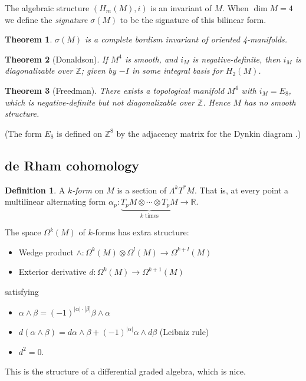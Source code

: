 \documentclass[a4paper]{article}
\newtheorem*{theorem}{Theorem}
\theoremstyle{definition}
\newtheorem*{definition}{Definition}
\theoremstyle{remark}
\newcommand{\Z}{\mathbb{Z}}
\newcommand{\R}{\mathbb{R}}
\begin{document}
The algebraic structure $(H_m(M),i)$ is an invariant of $M$. When $\dim M=4$ we
define the \emph{signature} $\sigma(M)$ to be the signature of this bilinear
form.

\begin{theorem}
    $\sigma(M)$ is a complete bordism invariant of oriented 4-manifolds.
\end{theorem}

\begin{theorem}[Donaldson]
    If $M^4$ is smooth, and $i_M$ is negative-definite, then $i_M$ is
    diagonalizable over $\Z$; given by $-I$ in some integral basis for $H_2(M)$.
\end{theorem}

\begin{theorem}[Freedman]
    There exists a topological manifold $M^4$ with $i_M=E_8$, which is
    negative-definite but not diagonalizable over $\Z$. Hence $M$ has no smooth
    structure.
\end{theorem}

(The form $E_8$ is defined on $\Z^8$ by the adjacency matrix for the Dynkin
diagram .)

\subsection*{de Rham cohomology}

\begin{definition}
    A \emph{$k$-form} on $M$ is a section of $\Lambda^kT^*M$. That is, at every
    point a multilinear alternating form
    $\alpha_p:\underbrace{T_pM\otimes\cdots\otimes T_pM}_{\text{$k$ times}}\to\R$.
\end{definition}

The space $\Omega^k(M)$ of $k$-forms has extra structure:
\begin{itemize}
    \item Wedge product $\wedge:\Omega^k(M)\otimes\Omega^l(M)\to\Omega^{k+l}(M)$
    \item Exterior derivative $d:\Omega^k(M)\to\Omega^{k+1}(M)$
\end{itemize}
satisfying
\begin{itemize}
    \item $\alpha\wedge\beta=(-1)^{|\alpha|\cdot|\beta|}\beta\wedge\alpha$
    \item $d(\alpha\wedge\beta)
        = d\alpha\wedge\beta+(-1)^{|\alpha|}\alpha\wedge d\beta$ (Leibniz rule)
    \item $d^2=0$.
\end{itemize}
This is the structure of a differential graded algebra, which is nice.
\end{document}
